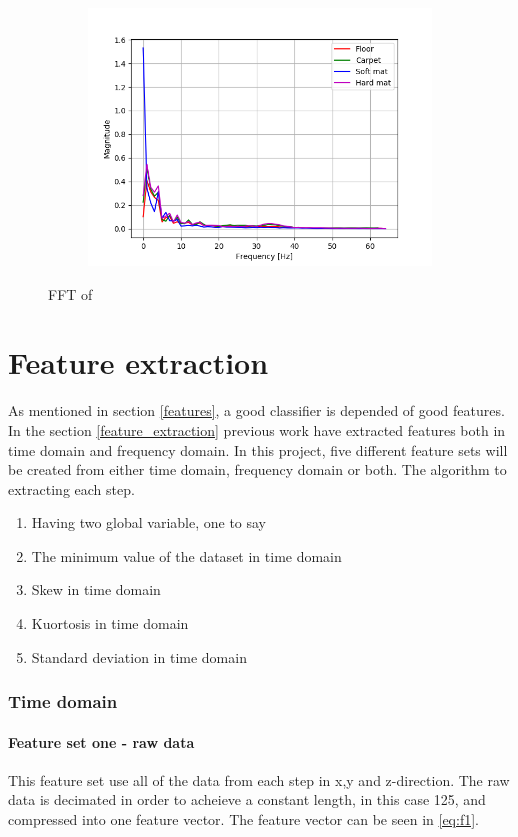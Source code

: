 \documentclass[USenglish]{ifimaster}  %
\begin{document}
\begin{figure}[h]
\begin{subfigure}{\linewidth}
\includegraphics[scale=0.4]{Figures/fftx}
\caption{}
\label{fig:sub3}
\end{subfigure}
\caption{FFT of }
\label{fig:fft}
\end{figure}


\section{Feature extraction}
As mentioned in section \ref{features}, a good classifier is depended of  good features. In the section \ref{feature_extraction} previous work have extracted features both in time domain and frequency domain. In this project, five different feature sets will be created from either time domain, frequency domain or both. 
The algorithm to extracting each step.
\begin{enumerate}
\item Having two global variable, one to say 
\item The minimum value of the dataset in time domain
\item Skew in time domain
\item Kuortosis in time domain 
\item Standard deviation in time domain
\end{enumerate}

\subsubsection{Time domain}

\paragraph{Feature set one - raw data} This feature set use all of the data from each step in x,y and z-direction. The raw data is decimated in order to acheieve a constant length, in this case 125, and compressed into one feature vector. The feature vector can be seen in \ref{eq:f1}.
\end{document}
